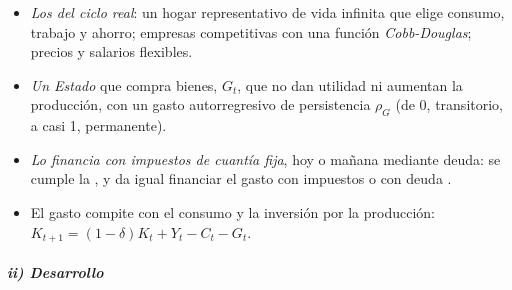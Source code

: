 \documentclass[11pt]{article}
\begin{document}
\begin{itemize}
\item \emph{Los del ciclo real}: un hogar representativo de vida infinita que elige consumo, trabajo y ahorro; empresas competitivas con una función \emph{Cobb-Douglas}; precios y salarios flexibles.
\item \emph{Un Estado} que compra bienes, $G_t$, que no dan utilidad ni aumentan la producción, con un gasto autorregresivo de persistencia $\rho_G$ (de 0, transitorio, a casi 1, permanente).
\item \emph{Lo financia con impuestos de cuantía fija}, hoy o mañana mediante deuda: se cumple la , y da igual financiar el gasto con impuestos o con deuda\nocite{Barro1974} .
\item El gasto compite con el consumo y la inversión por la producción: $K_{t+1}=(1-\delta)K_t+Y_t-C_t-G_t$.
\end{itemize}

\subparagraph{ii) Desarrollo}
\end{document}
